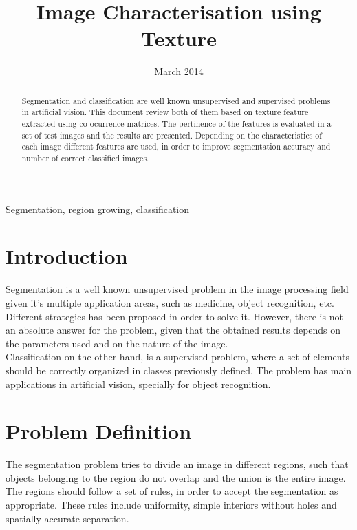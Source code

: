 \documentclass{IEEEtran}
\begin{document}
\title{Image Characterisation using Texture}
\date {March 2014}
\author{
}
\maketitle

\begin{abstract}
Segmentation and classification are well known unsupervised and supervised problems in artificial vision. This document review both of them based on texture feature extracted using co-ocurrence matrices. The pertinence of the features is evaluated in a set of test images and the results are presented. Depending on the characteristics of each image different features are used, in order to improve segmentation accuracy and number of correct classified images.
\end{abstract}

\begin{IEEEkeywords}
Segmentation, region growing, classification
\end{IEEEkeywords}

\section{Introduction}

Segmentation is a well known unsupervised problem in the image processing field given
it's multiple application areas, such as medicine, object recognition, etc.
Different strategies has been proposed in order to solve it. However, there is
not an absolute answer for the problem, given that the obtained results depends
on the parameters used and on the nature of the image.\\

Classification on the other hand, is a supervised problem, where a set of elements should be correctly organized in classes previously defined. The problem has main applications in artificial vision, specially for object recognition.\\

\section{Problem Definition}

The segmentation problem tries to divide an image in different regions, such
that objects belonging to the region do not overlap and the union is the entire image. The regions should follow a set of rules, in order to
accept the segmentation as appropriate. These rules include uniformity,
simple interiors without holes and spatially accurate separation.\\
\end{document}
